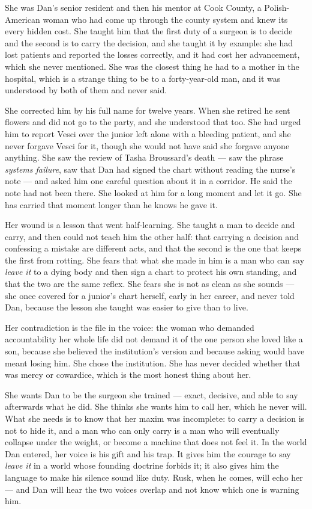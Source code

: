\documentclass{design/chronicle}
\begin{document}
{
She was Dan’s senior resident and then his mentor at Cook County, a Polish-American woman who had come up through the county system and knew its every hidden cost. She taught him that the first duty of a surgeon is to decide and the second is to carry the decision, and she taught it by example: she had lost patients and reported the losses correctly, and it had cost her advancement, which she never mentioned. She was the closest thing he had to a mother in the hospital, which is a strange thing to be to a forty-year-old man, and it was understood by both of them and never said.

She corrected him by his full name for twelve years. When she retired he sent flowers and did not go to the party, and she understood that too. She had urged him to report Vesci over the junior left alone with a bleeding patient, and she never forgave Vesci for it, though she would not have said she forgave anyone anything. She saw the review of Tasha Broussard’s death — saw the phrase \emph{systems failure}, saw that Dan had signed the chart without reading the nurse’s note — and asked him one careful question about it in a corridor. He said the note had not been there. She looked at him for a long moment and let it go. She has carried that moment longer than he knows he gave it.

Her wound is a lesson that went half-learning. She taught a man to decide and carry, and then could not teach him the other half: that carrying a decision and confessing a mistake are different acts, and that the second is the one that keeps the first from rotting. She fears that what she made in him is a man who can say \emph{leave it} to a dying body and then sign a chart to protect his own standing, and that the two are the same reflex. She fears she is not as clean as she sounds — she once covered for a junior’s chart herself, early in her career, and never told Dan, because the lesson she taught was easier to give than to live.

Her contradiction is the file in the voice: the woman who demanded accountability her whole life did not demand it of the one person she loved like a son, because she believed the institution’s version and because asking would have meant losing him. She chose the institution. She has never decided whether that was mercy or cowardice, which is the most honest thing about her.

She wants Dan to be the surgeon she trained — exact, decisive, and able to say afterwards what he did. She thinks she wants him to call her, which he never will. What she needs is to know that her maxim was incomplete: to carry a decision is not to hide it, and a man who can only carry is a man who will eventually collapse under the weight, or become a machine that does not feel it. In the world Dan entered, her voice is his gift and his trap. It gives him the courage to say \emph{leave it} in a world whose founding doctrine forbids it; it also gives him the language to make his silence sound like duty. Rusk, when he comes, will echo her — and Dan will hear the two voices overlap and not know which one is warning him.

}
\end{document}
